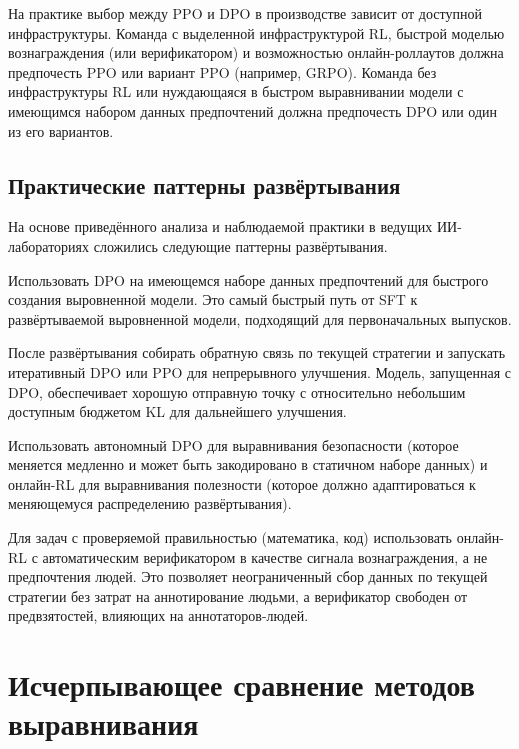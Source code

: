 На практике выбор между PPO и DPO в производстве зависит от доступной инфраструктуры. Команда с выделенной инфраструктурой RL, быстрой моделью вознаграждения (или верификатором) и возможностью онлайн-роллаутов должна предпочесть PPO или вариант PPO (например, GRPO). Команда без инфраструктуры RL или нуждающаяся в быстром выравнивании модели с имеющимся набором данных предпочтений должна предпочесть DPO или один из его вариантов.

\subsection{Практические паттерны развёртывания}

На основе приведённого анализа и наблюдаемой практики в ведущих ИИ-лабораториях сложились следующие паттерны развёртывания.

\begin{description}[leftmargin=!,labelwidth=3.5cm]
  \item[Начальный запуск с DPO] Использовать DPO на имеющемся наборе данных предпочтений для быстрого создания выровненной модели. Это самый быстрый путь от SFT к развёртываемой выровненной модели, подходящий для первоначальных выпусков.
  \item[Уточнение с онлайн-RL] После развёртывания собирать обратную связь по текущей стратегии и запускать итеративный DPO или PPO для непрерывного улучшения. Модель, запущенная с DPO, обеспечивает хорошую отправную точку с относительно небольшим доступным бюджетом KL для дальнейшего улучшения.
  \item[Разделение безопасности и способностей] Использовать автономный DPO для выравнивания безопасности (которое меняется медленно и может быть закодировано в статичном наборе данных) и онлайн-RL для выравнивания полезности (которое должно адаптироваться к меняющемуся распределению развёртывания).
  \item[RL с верификатором для рассуждений] Для задач с проверяемой правильностью (математика, код) использовать онлайн-RL с автоматическим верификатором в качестве сигнала вознаграждения, а не предпочтения людей. Это позволяет неограниченный сбор данных по текущей стратегии без затрат на аннотирование людьми, а верификатор свободен от предвзятостей, влияющих на аннотаторов-людей.
\end{description}

\section{Исчерпывающее сравнение методов выравнивания}
\label{sec:alignment-comparison}

